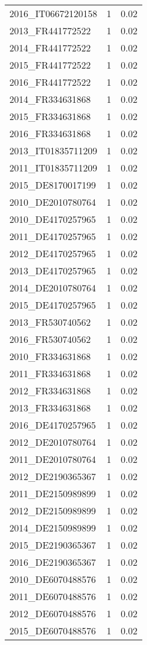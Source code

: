\begin{table*}[htbp]
\begin{tabular}{lrr}
2016_IT06672120158 & 1 & 0.02 \\
2013_FR441772522 & 1 & 0.02 \\
2014_FR441772522 & 1 & 0.02 \\
2015_FR441772522 & 1 & 0.02 \\
2016_FR441772522 & 1 & 0.02 \\
2014_FR334631868 & 1 & 0.02 \\
2015_FR334631868 & 1 & 0.02 \\
2016_FR334631868 & 1 & 0.02 \\
2013_IT01835711209 & 1 & 0.02 \\
2011_IT01835711209 & 1 & 0.02 \\
2015_DE8170017199 & 1 & 0.02 \\
2010_DE2010780764 & 1 & 0.02 \\
2010_DE4170257965 & 1 & 0.02 \\
2011_DE4170257965 & 1 & 0.02 \\
2012_DE4170257965 & 1 & 0.02 \\
2013_DE4170257965 & 1 & 0.02 \\
2014_DE2010780764 & 1 & 0.02 \\
2015_DE4170257965 & 1 & 0.02 \\
2013_FR530740562 & 1 & 0.02 \\
2016_FR530740562 & 1 & 0.02 \\
2010_FR334631868 & 1 & 0.02 \\
2011_FR334631868 & 1 & 0.02 \\
2012_FR334631868 & 1 & 0.02 \\
2013_FR334631868 & 1 & 0.02 \\
2016_DE4170257965 & 1 & 0.02 \\
2012_DE2010780764 & 1 & 0.02 \\
2011_DE2010780764 & 1 & 0.02 \\
2012_DE2190365367 & 1 & 0.02 \\
2011_DE2150989899 & 1 & 0.02 \\
2012_DE2150989899 & 1 & 0.02 \\
2014_DE2150989899 & 1 & 0.02 \\
2015_DE2190365367 & 1 & 0.02 \\
2016_DE2190365367 & 1 & 0.02 \\
2010_DE6070488576 & 1 & 0.02 \\
2011_DE6070488576 & 1 & 0.02 \\
2012_DE6070488576 & 1 & 0.02 \\
2015_DE6070488576 & 1 & 0.02 \\

\end{tabular}
\end{table*}

